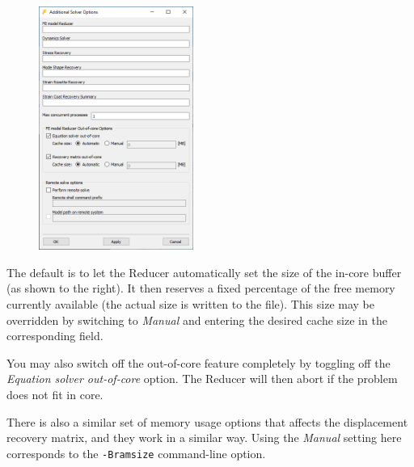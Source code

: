 {\begin{figure}
  \vspace{-4mm}
  \includegraphics[trim=0 155 0 245,clip,width=0.45\textwidth]
                  {Figures/Dialogs/6-AdditionalSolverOptions}
\end{figure}

The default is to let the Reducer automatically set the size of the in-core
buffer (as shown to the right). It then reserves a fixed percentage of the free
memory currently available (the actual size is written to the  file).
This size may be overridden by switching to {\sl Manual} and entering
the desired cache size in the corresponding field.

You may also switch off the out-of-core feature completely by toggling off the
{\sl Equation solver out-of-core} option.
The Reducer will then abort if the problem does not fit in core.

There is also a similar set of memory usage options that affects the
displacement recovery matrix, and they work in a similar way. Using the
{\sl Manual} setting here corresponds to the {\tt-Bramsize} command-line option.


}
